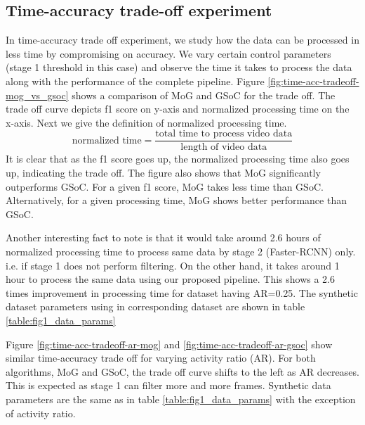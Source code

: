\subsection{Time-accuracy trade-off experiment}
In time-accuracy trade off experiment, we study how the data can be processed in less time by compromising on accuracy. We vary certain control parameters (stage 1 threshold in this case) and observe the time it takes to process the data along with the performance of the complete pipeline. Figure \ref{fig:time-acc-tradeoff-mog_vs_gsoc} shows a comparison of MoG and GSoC for the trade off. The trade off curve depicts f1 score on y-axis and normalized processing time on the x-axis. Next we give the definition of normalized processing time. 
$$\text{normalized time} = \frac{\text{total time to process video data}}{\text{length of video data}}$$
It is clear that as the f1 score goes up, the normalized processing time also goes up, indicating the trade off. The figure also shows that MoG significantly outperforms GSoC. For a given f1 score, MoG takes less time than GSoC. Alternatively, for a given processing time, MoG shows better performance than GSoC. 

Another interesting fact to note is that it would take around 2.6 hours of normalized processing time to process same data by stage 2 (Faster-RCNN) only. i.e. if stage 1 does not perform filtering. On the other hand, it takes around 1 hour to process the same data using our proposed pipeline.  This shows a 2.6 times improvement in processing time for dataset having AR=0.25. The synthetic dataset parameters using in corresponding dataset are shown in table \ref{table:fig1_data_params}

Figure \ref{fig:time-acc-tradeoff-ar-mog} and \ref{fig:time-acc-tradeoff-ar-gsoc} show similar time-accuracy  trade off for varying activity ratio (AR). For both algorithms, MoG and GSoC, the trade off curve shifts to the left as AR decreases. This is expected as stage 1 can filter more and more frames. Synthetic data parameters are the same as in table \ref{table:fig1_data_params} with the exception of activity ratio. 

